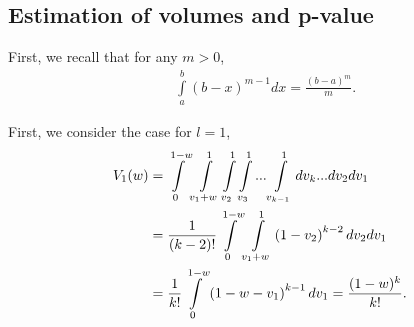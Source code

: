 \documentclass{llncs}
\begin{document}
\subsection{Estimation of volumes and p-value}
\label{seq:inference}
First, we recall that for any $m > 0$,
\begin{eqnarray}
&\displaystyle \int \limits_a^b \left(b-x\right)^{m-1}dx=
\displaystyle \frac{\left(b-a\right)^m}{m} . \label{eq:intab}
\end{eqnarray} 


First, we consider the case for $l = 1$,
\begin{align}
 V_{1}(w) &=  \displaystyle \displaystyle  \int\limits_0^{1-w}\int\limits_{{v_1}+w}^1\int\limits_{v_2}^1\int\limits_{v_3}^1...\int\limits_{v_{k-1}}^1 dv_k...dv_2 dv_1 \nonumber \\ 
& = \displaystyle \frac{1}{(k-2)!}\int\limits_0^{1-w}\int\limits_{{v_1}+w}^1\left( 1-v_2 \right)^{k-2} dv_2 dv_1 \nonumber \\
& = \displaystyle \frac{1}{k!} \int\limits_0^{1-w}\left( 1-w-v_1 \right)^{k-1} dv_1 = \frac{(1-w)^k}{k!}. \label{eq:p_1}
\end{align}
\end{document}
